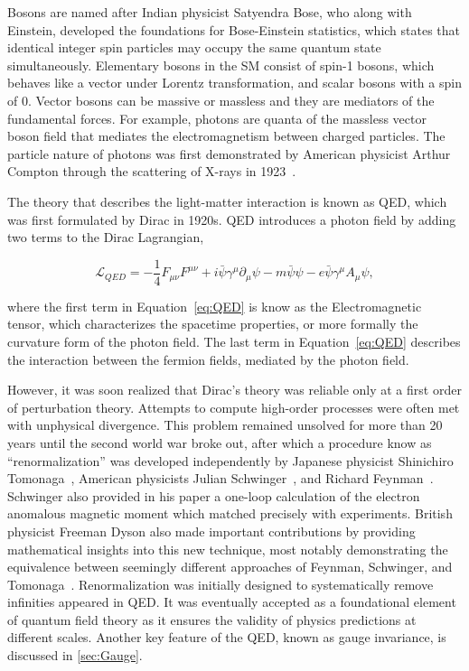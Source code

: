 Bosons are named after Indian physicist Satyendra Bose, who along with Einstein, developed the foundations for Bose-Einstein statistics, which states that identical integer spin particles may occupy the same quantum state simultaneously. Elementary bosons in the \ac{SM} consist of spin-1 bosons, which behaves like a vector under Lorentz transformation, and scalar bosons with a spin of 0. Vector bosons can be massive or massless and they are mediators of the fundamental forces. For example, photons are quanta of the massless vector boson field that mediates the electromagnetism between charged particles. The particle nature of photons was first demonstrated by American physicist Arthur Compton through the scattering of X-rays in 1923~\cite{PhysRev.21.483}.

The theory that describes the light-matter interaction is known as \ac{QED}, which was first formulated by Dirac in 1920s. \ac{QED} introduces a photon field by adding two terms to the Dirac Lagrangian,

\begin{equation}
\label{eq:QED}
\mathcal{L}_{QED}=-\frac{1}{4}F_{\mu\nu}F^{\mu\nu}+i\bar{\psi}\gamma^{\mu}\partial_{\mu}\psi-m\bar{\psi}\psi-e\bar{\psi}\gamma^{\mu}A_{\mu}\psi,
\end{equation}

where the first term in Equation~\ref{eq:QED} is know as the Electromagnetic tensor, which characterizes the spacetime properties, or more formally the curvature form of the photon field. The last term in Equation~\ref{eq:QED} describes the interaction between the fermion fields, mediated by the photon field. 

However, it was soon realized that Dirac's theory was reliable only at a first order of perturbation theory. Attempts to compute high-order processes were often met with unphysical divergence. This problem remained unsolved for more than 20 years until the second world war broke out, after which a procedure know as ``renormalization'' was developed independently by Japanese physicist Shinichiro Tomonaga~\cite{Tomonaga:1946zz}, American physicists Julian Schwinger~\cite{Schwinger:1948iu}, and Richard Feynman~\cite{Feynman:1950ir}. Schwinger also provided in his paper a one-loop calculation of the electron anomalous magnetic moment which matched precisely with experiments. British physicist Freeman Dyson also made important contributions by providing mathematical insights into this new technique, most notably demonstrating the equivalence between seemingly different approaches of Feynman, Schwinger, and Tomonaga~\cite{Dyson:1949bp}. Renormalization was initially designed to systematically remove infinities appeared in \ac{QED}. It was eventually accepted as a foundational element of quantum field theory as it ensures the validity of physics predictions at different scales. Another key feature of the \ac{QED}, known as gauge invariance, is discussed in \autoref{sec:Gauge}.

